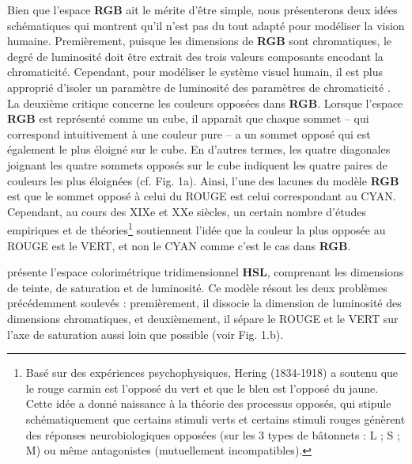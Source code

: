 \documentclass{article}
\begin{document}
Bien que l'espace \textbf{RGB} ait le mérite d'être simple, nous présenterons deux idées schématiques qui montrent qu'il n'est pas du tout adapté pour modéliser la vision humaine. Premièrement, puisque les dimensions de \textbf{RGB} sont chromatiques, le degré de luminosité doit être extrait des trois valeurs composants encodant la chromaticité. Cependant, pour modéliser le système visuel humain, il est plus approprié d'isoler un paramètre de luminosité des paramètres de chromaticité \parencite[p.78]{fairchild2013}. La deuxième critique concerne les couleurs opposées dans \textbf{RGB}. Lorsque l'espace \textbf{RGB} est représenté comme un cube, il apparaît que chaque sommet -- qui correspond intuitivement à une \og couleur pure \fg -- a un sommet opposé qui est également le plus éloigné sur le cube. En d'autres termes, les quatre diagonales joignant les quatre sommets opposés sur le cube indiquent les quatre paires de couleurs les plus éloignées (cf. Fig. 1a). Ainsi, l'une des lacunes du modèle \textbf{RGB} est que le sommet opposé à celui du ROUGE est celui correspondant au CYAN. Cependant, au cours des XIXe et XXe siècles, un certain nombre d'études empiriques et de théories\footnote{Basé sur des expériences psychophysiques, Hering (1834-1918) a soutenu que le rouge carmin est l'opposé du vert et que le bleu est l'opposé du jaune. Cette idée a donné naissance à la théorie des processus opposés, qui stipule schématiquement que certains stimuli verts et certains stimuli rouges génèrent des réponses neurobiologiques opposées (sur les 3 types de bâtonnets : L ; S ; M) ou même antagonistes (mutuellement incompatibles).} soutiennent l'idée que la couleur la plus opposée au ROUGE est le VERT, et non le CYAN comme c'est le cas dans \textbf{RGB}.

\textcite[section 2.1]{gardenfors_2017} présente l'espace colorimétrique tridimensionnel \textbf{HSL}, comprenant les dimensions de teinte, de saturation et de luminosité. Ce modèle résout les deux problèmes précédemment soulevés : premièrement, il dissocie la dimension de luminosité des dimensions chromatiques, et deuxièmement, il sépare le ROUGE et le VERT sur l'axe de saturation aussi loin que possible (voir Fig. 1.b).
\end{document}
